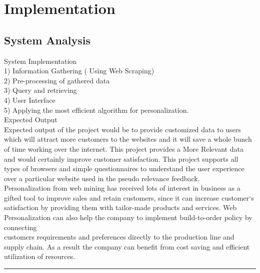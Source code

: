 \newpage
\chapter{Implementation}
\section{System Analysis}

System Implementation\\
1) Information Gathering ( Using Web Scraping)\\
2) Pre-processing of gathered data\\
3) Query and retrieving\\
4) User Interface\\
5) Applying the most efficient algorithm for personalization.\\
Expected Output\\

Expected output of the project would be to provide customized data to users which
will attract more customers to the websites and it will save a whole bunch of time
working over the internet. This project provides a More Relevant data and would
certainly improve customer satisfaction. This project supports all types of browsers
and simple questionnaires to understand the user experience over a particular website used in the pseudo relevance feedback.\\
Personalization from web mining has received lots of interest in business as a gifted
tool to improve sales and retain customers, since it can increase customer‘s satisfaction by providing them with tailor-made products and services. Web Personalization can also help the company to implement build-to-order policy by connecting\\
customers requirements and preferences directly to the production line and supply
chain. As a result the company can benefit from cost saving and efficient utilization
of resources.\\
\vspace{10mm}
\hrule